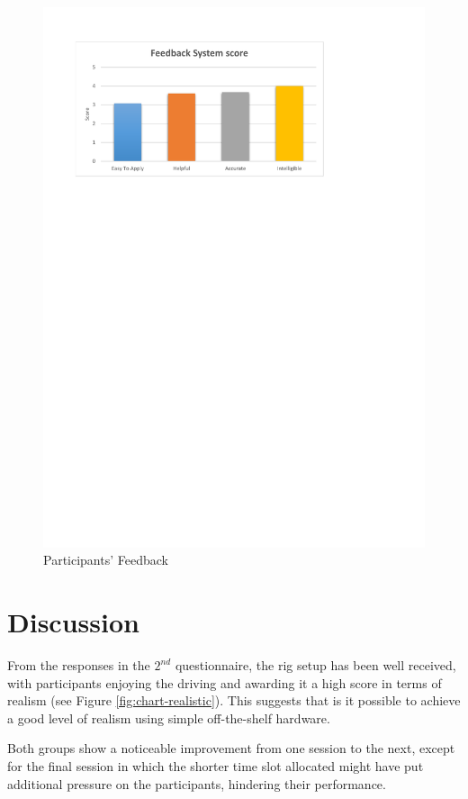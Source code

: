 \begin{figure}[!htb]
	\centering
	\includegraphics[width=\textwidth]{charts/feedbacksystemfeedback.pdf}
	\caption[Participants' Feedback]{Participants' Feedback}
	\label{fig:chart-feedbacksystemfeedback}
\end{figure}

\section{Discussion}
\label{sec:eval-Discussion}
From the responses in the $2^{nd}$ questionnaire, the rig setup has been well received, with participants enjoying the driving and awarding it a high score in terms of realism (see Figure \ref{fig:chart-realistic}). This suggests that is it possible to achieve a good level of realism using simple off-the-shelf hardware. 

Both groups show a noticeable improvement from one session to the next, except for the final session in which the shorter time slot allocated might have put additional pressure on the participants, hindering their performance.

